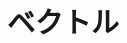 \documentclass[../../topic_linear-algebra]{subfiles}
\begin{document}
\chapter{ベクトル}



\end{document}
